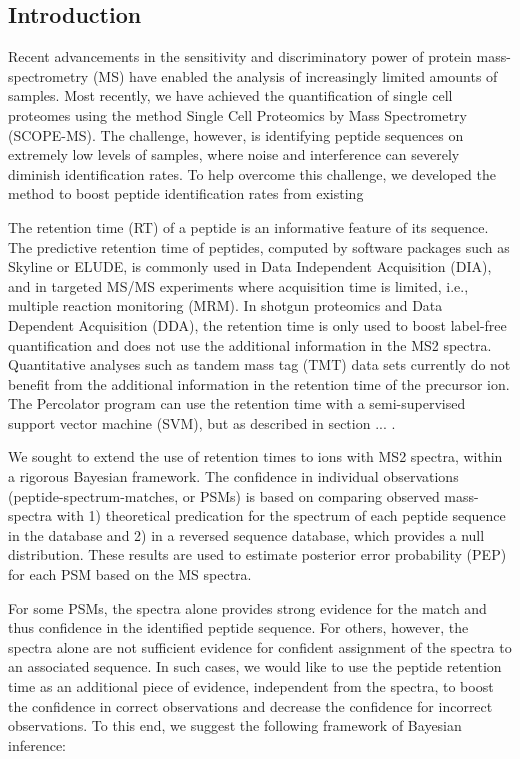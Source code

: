\begin{spacing}{1.55} 
\vspace{1cm}

\newpage


\section{Introduction}

Recent advancements in the sensitivity and discriminatory power of protein mass-spectrometry (MS) have enabled the analysis of increasingly limited amounts of samples. Most recently, we have achieved the quantification of single cell proteomes using the method Single Cell Proteomics by Mass Spectrometry (SCOPE-MS). The challenge, however, is identifying peptide sequences on extremely low levels of samples, where noise and interference can severely diminish identification rates. To help overcome this challenge, we developed the \methodname\;method to boost peptide identification rates from existing  

The retention time (RT) of a peptide is an informative feature of its sequence. The predictive retention time of peptides, computed by software packages such as Skyline or ELUDE, is commonly used in Data Independent Acquisition (DIA), and in targeted MS/MS experiments where acquisition time is limited, i.e., multiple reaction monitoring (MRM). In shotgun proteomics and Data Dependent Acquisition (DDA), the retention time is only used to boost label-free quantification and does not use the additional information in the MS2 spectra. Quantitative analyses such as tandem mass tag (TMT) data sets currently do not benefit from the additional information in the retention time of the precursor ion. The Percolator program can use the retention time with a semi-supervised support vector machine (SVM), but as described in section ... \citep{kall2007percolator}.

We sought to extend the use of retention times to ions with MS2 spectra, within a rigorous Bayesian framework. The confidence in individual observations (peptide-spectrum-matches, or PSMs) is based on comparing observed mass-spectra with 1) theoretical predication for the spectrum of each peptide sequence in the database and 2) in a reversed sequence database, which provides a null distribution. These results are used to estimate posterior error probability (PEP) for each PSM based on the MS spectra. 

For some PSMs, the spectra alone provides strong evidence for the match and thus confidence in the identified peptide sequence. For others, however, the spectra alone are not sufficient evidence for confident assignment of the spectra to an associated sequence. In such cases, we would like to use the peptide retention time as an additional piece of evidence, independent from the spectra, to boost the confidence in correct observations and decrease the confidence for incorrect observations. To this end, we suggest the following framework of Bayesian inference:


\end{spacing}
